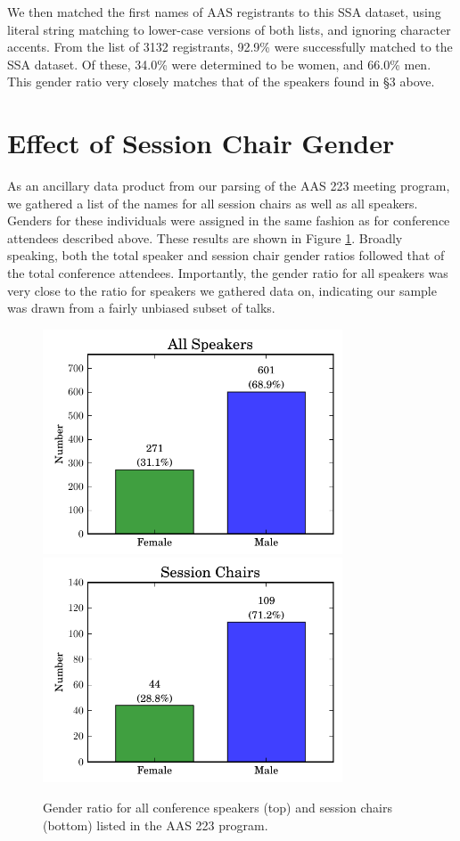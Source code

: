 \documentclass[iop]{emulateapj}
\begin{document}
We then matched the first names of AAS registrants to this SSA dataset, using literal string matching to lower-case versions of both lists, and ignoring character accents. From the list of 3132 registrants, 92.9\% were successfully matched to the SSA dataset. Of these,  34.0\% were determined to be women, and 66.0\% men. This gender ratio very closely matches that of the speakers found in \S3 above.



\section{Effect of Session Chair Gender}

As an ancillary data product from our parsing of the AAS 223 meeting program, we gathered a list of the names for all session chairs as well as all speakers. Genders for these individuals were assigned in the same fashion as for conference attendees described above. These results are shown in Figure \ref{fig:speakerchair}. Broadly speaking, both the total speaker and session chair gender ratios followed that of the total conference attendees. Importantly, the gender ratio for all speakers was very close to the ratio for speakers we gathered data on, indicating our sample was drawn from a fairly unbiased subset of talks.

\begin{figure}[!t]
\centering
\includegraphics[width=3.5in]{speakers}
\includegraphics[width=3.5in]{chairs}
\caption{Gender ratio for all conference speakers (top) and session chairs (bottom) listed in the AAS 223 program.}
\label{fig:speakerchair}
\end{figure}
\end{document}
